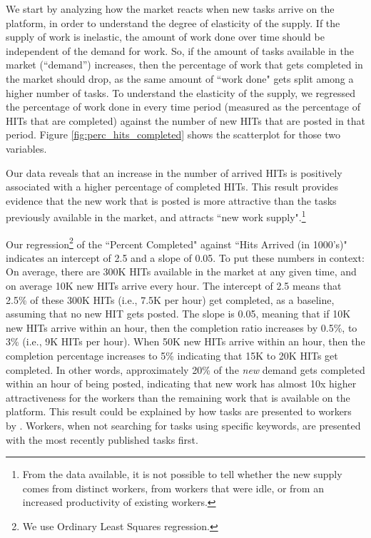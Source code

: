 We start by analyzing how the market reacts when new tasks arrive on the
platform, in order to understand the degree of elasticity of the supply. If the supply of work is inelastic, the amount of work done over time should
be independent of the demand for work. So, if the amount of tasks
available in the market (``demand'') increases, then the percentage of
work that gets completed in the market should drop, as the same amount of ``work done" gets split among a higher number of tasks. To
understand the elasticity of the supply, we regressed the percentage of
work done in every time period (measured as the percentage of HITs
that are completed) against the number of new HITs that are posted in
that period. Figure \ref{fig:perc_hits_completed} shows the scatterplot for those two variables.

Our data reveals that an increase in the number of arrived HITs is
positively associated with a higher percentage of completed HITs. This
result provides evidence that the new work that is posted is more
attractive than the tasks previously available in the market, and attracts ``new
work supply".\footnote{From the data available, it is not possible to tell
whether the new supply comes from distinct
workers, from workers that were idle, or from an increased productivity
of existing workers.}

Our regression\footnote{We use Ordinary Least Squares regression.} of the ``Percent Completed" against ``Hits Arrived (in
1000's)" indicates an intercept of 2.5 and a slope of 0.05. To put
these numbers in context: On average, there are 300K
HITs available in the market at any given time, and on average 10K new HITs arrive
every hour. The intercept of 2.5 means that 2.5\% of these 300K HITs
(i.e., 7.5K per hour) get completed, as a baseline, assuming that no
new HIT gets posted. The slope is 0.05, meaning that if 10K new HITs
arrive within an hour, then the completion ratio increases by
0.5\%, to 3\% (i.e., 9K HITs per hour). When 50K new HITs arrive within
an hour, then the completion percentage increases to 5\% indicating
that 15K to 20K HITs get completed. In other words, approximately 20\%
of the \emph{new} demand gets completed within an hour of being posted,
indicating that new work has almost 10x higher attractiveness for the
workers than the remaining work that is available on the platform.
% 
This result could be explained by how tasks are presented to workers by \amt{}.
Workers, when not searching for tasks using specific keywords, are presented with the most recently published tasks first.


